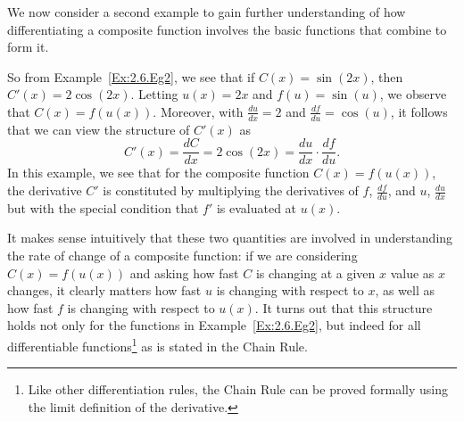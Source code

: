 


We now consider a second example %
 to gain further understanding of how differentiating a composite function involves the basic functions that combine to form it.


So from Example~\ref{Ex:2.6.Eg2}, we see that if $C(x) = \sin(2x)$, then $C'(x) = 2\cos(2x)$.  Letting $u(x) = 2x$ and $f(u) = \sin(u)$, we observe that $C(x) = f(u(x))$.  Moreover, with $\frac{du}{dx} = 2$ and $\frac{df}{du} = \cos(u)$, it follows that we can view the structure of $C'(x)$ as
$$C'(x) = \dfrac{dC}{dx} = 2\cos(2x) =  \dfrac{du}{dx} \cdot \dfrac{df}{du}.$$
In this example, we see that for the composite function $C(x) = f(u(x))$, the derivative $C'$ is constituted by multiplying the derivatives of $f$, $\frac{df}{du}$, and $u$, $\frac{du}{dx}$ but with the special condition that $f'$ is evaluated at $u(x)$.%

It makes sense intuitively that these two quantities are involved in understanding the rate of change of a composite function:  if we are considering $C(x) = f(u(x))$ and asking how fast $C$ is changing at a given $x$ value as $x$ changes, it clearly matters how fast $u$ is changing with respect to $x$, as well as how fast $f$ is changing with respect to $u(x)$.  It turns out that this structure holds not only for the functions in Example~\ref{Ex:2.6.Eg2}, but indeed for all differentiable functions\footnote{Like other differentiation rules, the Chain Rule can be proved formally using the limit definition of the derivative.} as is stated in the Chain Rule.


